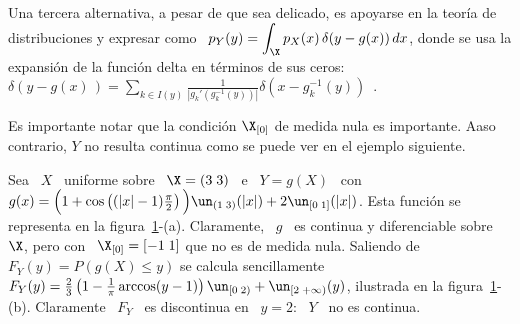 Una tercera alternativa, a pesar de que sea delicado, es apoyarse en la teor\'ia
de distribuciones  y expresar como \  $\displaystyle p_Y(y) =  \int_\X p_X(x) \,
\delta(y-g(x)) \,  dx$, donde  se usa  la expansi\'on de  la funci\'on  delta en
t\'erminos de sus ceros:  \ $\delta(y-g(x)\,)= \sum_{k \in I(y)} \frac{1}{\left|
    g_k'\left(          g_k^{-1}          (y)          \right)          \right|}
\delta(x-g_k^{-1}(y))$~\cite{ManWol95}.

Es  importante   notar  que  la   condici\'on  $\X_{[0]}$  de  medida   nula  es
importante. Aaso  contrario, $Y$  no resulta  continua como se  puede ver  en el
ejemplo siguiente.
%
\begin{ejemplo}
\label{Ej:MP:X0MedidaNoNula}
%
Sea \ $X$ \ uniforme sobre  \ $\X = ( 3 \; 3)$ \ e \ $Y  = g(X)$ \ con \ $g(x) =
\Big(  1 +  \cos\left(  (|x|-1) \frac{\pi}{2} \right) \Big)  \un_{(1 \;  3)}(|x|) +  2
  \un_{[0    \;   1]}(|x|)$.     Esta    funci\'on   se    representa   en    la
  figura~\ref{Fig:MP:TransformacionVANoContinua}-(a).   Claramente, \  $g$  \ es
  continua y diferenciable sobre $\X$, pero con \ $\X_{[0]} = [ -1 \; 1]$ que no
  es  de  medida  nula.   Saliendo  de  $F_Y(y) =  P(g(X)  \le  y)$  se  calcula
  sencillamente  $F_Y(y) =  \frac23 \left(  1 -  \frac1\pi  \arccos(y-1) \right)
  \un_{[0   \;   2)}   +   \un_{[   2  \;   +\infty)}(y)$,   ilustrada   en   la
  figura~\ref{Fig:MP:TransformacionVANoContinua}-(b).   Claramente \ $F_Y$  \ es
  discontinua en \ $y = 2$: \ $Y$ \ no es continua.
  \begin{figure}[h!]
  \begin{center}  \end{center}
  \label{Fig:MP:TransformacionVANoContinua}
  \end{figure}
\end{ejemplo}

